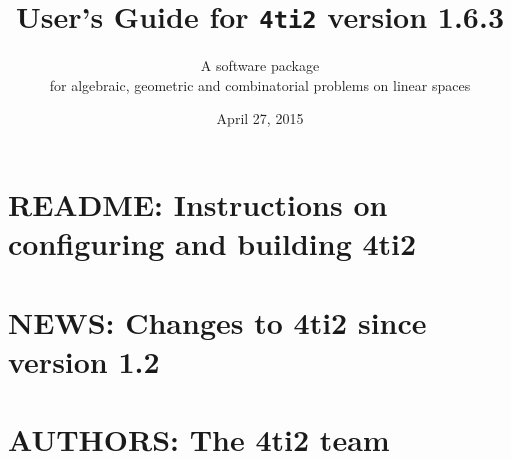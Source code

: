 \documentclass[12pt,a4]{book}
\newcommand{\1}{{\bf 1}}
\newcommand{\FourTiTwo}{{\tt 4ti2}}
\begin{document}
\thispagestyle{empty}

\title{User's Guide for \FourTiTwo{} version 1.6.3}

\author{A software package\\ for algebraic,
geometric and combinatorial problems on linear spaces}
\date{April 27, 2015}

\maketitle

\newpage
\thispagestyle{empty}


\tableofcontents





\chapter{README: Instructions on configuring and building 4ti2}

{\small

}

\chapter{NEWS: Changes to 4ti2 since version 1.2}

{\small

}

\clearpage
{}
\chapter*{AUTHORS: The 4ti2 team}



\clearpage
{}



\clearpage

\end{document}
